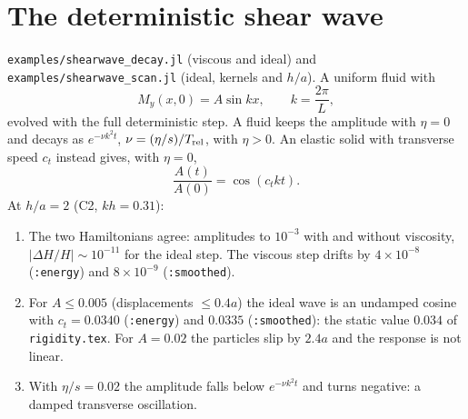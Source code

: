 \documentclass[11pt,aps,preprint,nofootinbib,superscriptaddress,tightenlines]{revtex4-2}
\def\st{\begin{equation}}
\def\stp{\end{equation}}
\begin{document}
\section{The deterministic shear wave}
\label{sec:shear}

\texttt{examples/shearwave\_decay.jl} (viscous and ideal) and
\texttt{examples/shearwave\_scan.jl} (ideal, kernels and $h/a$).  A uniform fluid with
\st
M_y(x,0)=A\sin kx,\qquad k=\frac{2\pi}{L},
\stp
evolved with the full deterministic step.  A fluid keeps the amplitude with $\eta=0$
and decays as $e^{-\nu k^2t}$, $\nu=(\eta/s)/T_{\rm rel}$, with $\eta>0$.  An elastic
solid with transverse speed $c_t$ instead gives, with $\eta=0$,
\st
\frac{A(t)}{A(0)}=\cos(c_tkt).
\stp
At $h/a=2$ (C2, $kh=0.31$):
\begin{enumerate}
\item The two Hamiltonians agree: amplitudes to $10^{-3}$ with and without viscosity,
  $|\Delta H/H|\sim10^{-11}$ for the ideal step.  The viscous step drifts by
  $4\times10^{-8}$ (\texttt{:energy}) and $8\times10^{-9}$ (\texttt{:smoothed}).
\item For $A\le0.005$ (displacements $\le0.4a$) the ideal wave is an undamped cosine with
  $c_t=0.0340$ (\texttt{:energy}) and $0.0335$ (\texttt{:smoothed}): the static value
  $0.034$ of \texttt{rigidity.tex}.  For $A=0.02$ the particles slip by $2.4a$ and the
  response is not linear.
\item With $\eta/s=0.02$ the amplitude falls below $e^{-\nu k^2t}$ and turns negative: a
  damped transverse oscillation.
\end{enumerate}
\end{document}
